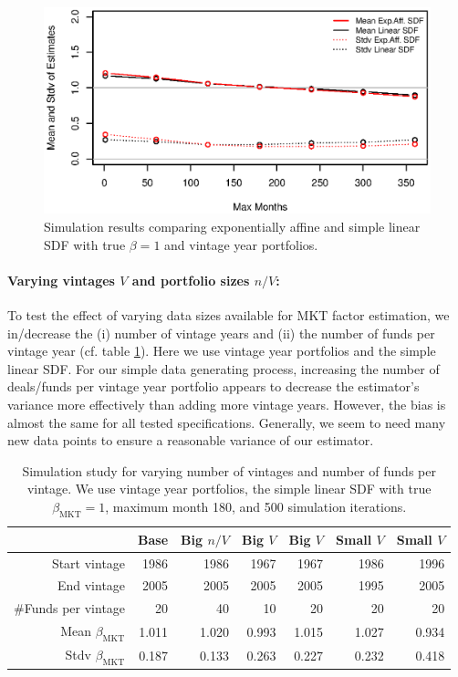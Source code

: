 \documentclass[12pt]{article}
\begin{document}
\begin{figure}
	\centering
	\includegraphics{eps/Simulationexpaffvssimlin}
	\caption{Simulation results comparing exponentially affine and simple linear SDF with true $\beta=1$ and vintage year portfolios.}
	\label{fig:simulation_expaff_vs_simlin}
\end{figure}


\paragraph{Varying vintages $V$ and portfolio sizes $n/V$:}
To test the effect of varying data sizes available for MKT factor estimation, we in/decrease the (i) number of vintage years and (ii) the number of funds per vintage year (cf. table \ref{tab:simulation_study_size}).
Here we use vintage year portfolios and the simple linear SDF.
For our simple data generating process, increasing the number of deals/funds per vintage year portfolio appears to decrease the estimator's variance more effectively than adding more vintage years.
However, the bias is almost the same for all tested specifications.
Generally, we seem to need many new data points to ensure a reasonable variance of our estimator.

\begin{table}[ht]
	\centering
	\begin{tabular}{rrrrrrr}
		& Base & Big $n/V$ & Big $V$ & Big $V$ & Small $V$ & Small $V$ \\ 
		\hline
		\hline
		Start vintage & 1986 & 1986 & 1967 & 1967 & 1986 & 1996 \\ 
		End vintage & 2005 & 2005 & 2005 & 2005 & 1995 & 2005 \\ 
		\#Funds per vintage & 20 & 40 & 10 & 20 & 20 & 20 \\ 
		\hline
		Mean $\beta_{\mathrm{MKT}}$ & 1.011 & 1.020 & 0.993 & 1.015 & 1.027 & 0.934 \\ 
		Stdv $\beta_{\mathrm{MKT}}$ & 0.187 & 0.133 & 0.263 & 0.227 & 0.232 & 0.418 \\ 
		\hline
		\hline
	\end{tabular}
	\caption{Simulation study for varying  number of vintages and number of funds per vintage. 
		   We use vintage year portfolios, the simple linear SDF with true $\beta_{\mathrm{MKT}}=1$, maximum month 180, and 500 simulation iterations.} 
	\label{tab:simulation_study_size}
\end{table}
\end{document}
